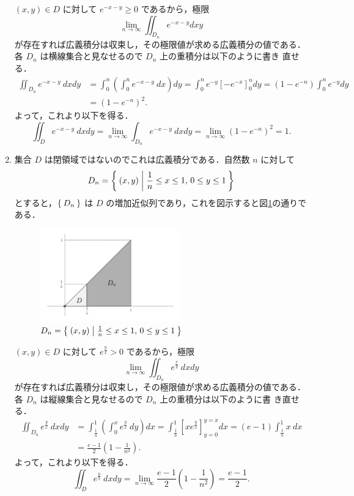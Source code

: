 \documentclass[11pt, uplatex, dvipdfmx]{jsarticle}
\begin{document}
\begin{enumerate}[(1)]
     $(x,y) \in D$ に対して $e^{-x-y}
     \geq 0 $ であるから，極限
     \[
       \lim_{n \to \infty} \iint_{D_n} e^{-x-y} dx y
     \]
     が存在すれば広義積分は収束し，その極限値が求める広義積分の値である．
     各 $D_n$ は横線集合と見なせるので $D_n$ 上の重積分は以下のように書き
     直せる．
     \begin{align*}
       \iint_{D_n} e^{-x-y}\ dx dy
       &= \int_{0}^{n} \left(\int_{0}^{n} e^{-x-y} \  dx \right) dy
         = \int_{0}^{n} e^{-y} \left[-e^{-x}\right]_{0}^{n} dy = (1-e^{-n})\int_{0}^{n}e^{-y} dy\\
       &=(1-e^{-n})^2.
     \end{align*}
     よって，これより以下を得る．
     \[
       \iint_D e^{-x-y}\ dxdy = \lim_{n \to \infty} \int_{D_n} e^{-x-y} \ dxdy 
       = \lim_{n \to \infty} \left(1-e^{-n}\right)^2 =1.
     \]

   \item 集合 $D$ は閉領域ではないのでこれは広義積分である．自然数 $n$ に対して
     \[
       D_n=\Set{(x,y) | \frac{1}{n} \leq x \leq 1, \, 0 \leq y \leq 1}
     \]
     とすると，$\Set{D_n}$ は $D$ の増加近似列であり，これを図示すると図\ref{fig:no18}の通りである．
     \begin{figure}[h]
       \centering
       \includegraphics[height=4cm]{./pictures/no18.pdf}
       \caption{ $D_n=\Set{(x,y)  |  \frac{1}{n} \leq x \leq 1, \, 0 \leq y \leq 1}$}\label{fig:no18}
     \end{figure}

     $(x, y) \in D$ に対して $e^{\frac{y}{x}}>0$ であるから，極限
     \[
       \lim_{n \to \infty} \iint_{D_n} e^{\frac{x}{y}}\  dx dy
     \]
     が存在すれば広義積分は収束し，その極限値が求める広義積分の値である．
     各 $D_n$ は縦線集合と見なせるので $D_n$ 上の重積分は以下のように書
     き直せる．
     \begin{align*}
       \iint_{D_n} e^{\frac{y}{x}}\ dx dy
       &= \int_{\frac{1}{n}}^{1} \left( \int_{0}^{x} e^{\frac{y}{x}}\ dy \right) dx
         =\int_{\frac{1}{n}}^{1}\left[xe^{\frac{y}{x}}\right]_{y=0}^{y=x} dx
         =(e-1) \int_{\frac{1}{n}}^{1}x \ dx\\
       &= \frac{e-1}{2}\left( 1- \frac{1}{n^2}\right).
     \end{align*}
     よって，これより以下を得る．
     \[
       \iint_{D} e^{\frac{y}{x}}\ dx dy = \lim_{n \to \infty} \frac{e-1}{2}\left(1-\frac{1}{n^2}\right) = \frac{e-1}{2}.
     \]
 


\end{enumerate}
\end{document}
